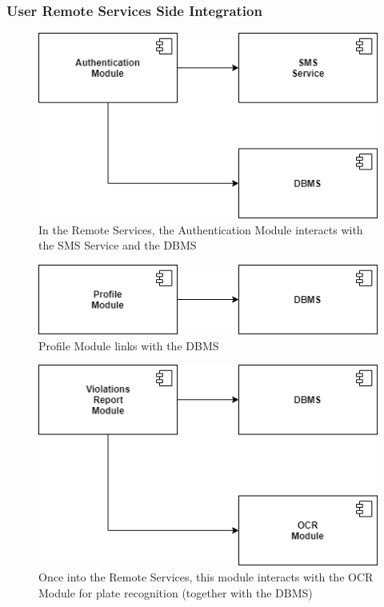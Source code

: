 \documentclass[12pt,a4paper]{article}
\begin{document}
\subsubsection{User Remote Services Side Integration}
\begin{figure}[H]
		\centering
		\includegraphics[width=0.5\linewidth]{../assets/images/auth_mod_serv.png}
		\caption{In the Remote Services, the Authentication Module interacts with the SMS Service and the DBMS}
\end{figure}
\begin{figure}[H]
		\centering
		\includegraphics[width=0.5\linewidth]{../assets/images/prof_mod_serv.png}
		\caption{Profile Module links with the DBMS}
\end{figure}
\begin{figure}[H]
		\centering
		\includegraphics[width=0.5\linewidth]{../assets/images/viol_rep_serv.png}
		\caption{Once into the Remote Services, this module interacts with the OCR Module for plate recognition (together with the DBMS)}
\end{figure}
\end{document}
